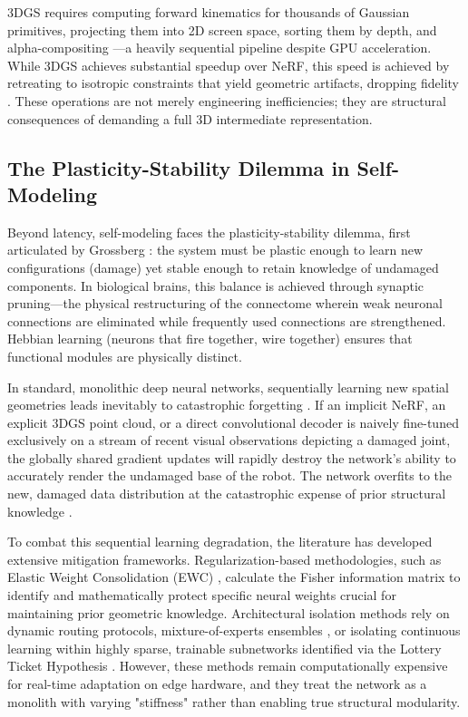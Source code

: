 \documentclass[12pt,a4paper,oneside]{report}
\begin{document}
3DGS requires computing forward kinematics for thousands of Gaussian primitives, projecting them into 2D screen space, sorting them by depth, and alpha-compositing \cite{kerbl20233d}—a heavily sequential pipeline despite GPU acceleration. While 3DGS achieves substantial speedup over NeRF, this speed is achieved by retreating to isotropic constraints that yield geometric artifacts, dropping fidelity \cite{hu2025learning}. These operations are not merely engineering inefficiencies; they are structural consequences of demanding a full 3D intermediate representation.

\subsection{The Plasticity-Stability Dilemma in Self-Modeling}
\label{subsec:plasticity_stability}

Beyond latency, self-modeling faces the plasticity-stability dilemma, first articulated by Grossberg \cite{grossberg1987competitive}: the system must be plastic enough to learn new configurations (damage) yet stable enough to retain knowledge of undamaged components. In biological brains, this balance is achieved through synaptic pruning—the physical restructuring of the connectome wherein weak neuronal connections are eliminated while frequently used connections are strengthened. Hebbian learning (neurons that fire together, wire together) ensures that functional modules are physically distinct.

In standard, monolithic deep neural networks, sequentially learning new spatial geometries leads inevitably to catastrophic forgetting \cite{mccloskey1989catastrophic, french1999catastrophic}. If an implicit NeRF, an explicit 3DGS point cloud, or a direct convolutional decoder is naively fine-tuned exclusively on a stream of recent visual observations depicting a damaged joint, the globally shared gradient updates will rapidly destroy the network's ability to accurately render the undamaged base of the robot. The network overfits to the new, damaged data distribution at the catastrophic expense of prior structural knowledge \cite{kirkpatrick2017overcoming}.

To combat this sequential learning degradation, the literature has developed extensive mitigation frameworks. Regularization-based methodologies, such as Elastic Weight Consolidation (EWC) \cite{kirkpatrick2017overcoming}, calculate the Fisher information matrix to identify and mathematically protect specific neural weights crucial for maintaining prior geometric knowledge. Architectural isolation methods rely on dynamic routing protocols, mixture-of-experts ensembles \cite{mocanu2018scalable}, or isolating continuous learning within highly sparse, trainable subnetworks identified via the Lottery Ticket Hypothesis \cite{frankle2018lottery}. However, these methods remain computationally expensive for real-time adaptation on edge hardware, and they treat the network as a monolith with varying "stiffness" rather than enabling true structural modularity.
\end{document}
